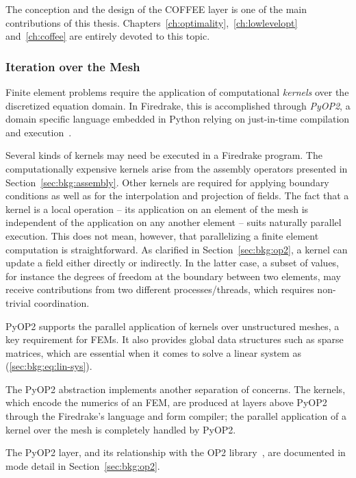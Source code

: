 The conception and the design of the COFFEE layer is one of the main contributions of this thesis. Chapters~\ref{ch:optimality},~\ref{ch:lowlevelopt} and~\ref{ch:coffee} are entirely devoted to this topic.

\subsubsection{Iteration over the Mesh}
\label{sec:bkg:meshiteration}
Finite element problems require the application of computational {\em kernels} over the discretized equation domain. In Firedrake, this is accomplished through {\em PyOP2}, a domain specific language embedded in Python relying on just-in-time compilation and execution~\citep{pyop2isc}. 

Several kinds of kernels may need be executed in a Firedrake program. The computationally expensive kernels arise from the assembly operators presented in Section~\ref{sec:bkg:assembly}. Other kernels are required for applying boundary conditions as well as for the interpolation and projection of fields. The fact that a kernel is a local operation -- its application on an element of the mesh is independent of the application on any another element -- suits naturally parallel execution. This does not mean, however, that parallelizing a finite element computation is straightforward. As clarified in Section~\ref{sec:bkg:op2}, a kernel can update a field either directly or indirectly. In the latter case, a subset of values, for instance the degrees of freedom at the boundary between two elements, may receive contributions from two different processes/threads, which requires non-trivial coordination.

PyOP2 supports the parallel application of kernels over unstructured meshes, a key requirement for FEMs. It also provides global data structures such as sparse matrices, which are essential when it comes to solve a linear system as (\ref{sec:bkg:eq:lin-sys}).

The PyOP2 abstraction implements another separation of concerns. The kernels, which encode the numerics of an FEM, are produced at layers above PyOP2 through the Firedrake's language and form compiler; the parallel application of a kernel over the mesh is completely handled by PyOP2. 

The PyOP2 layer, and its relationship with the OP2 library~\cite{op2-main}, are documented in mode detail in Section~\ref{sec:bkg:op2}.


